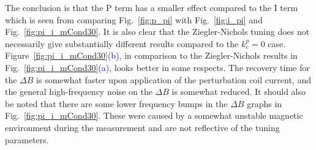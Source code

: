 
The conclusion is that the P term has a smaller effect compared to the
I term which is seen from comparing Fig.~\ref{fig:p_pi} with
Fig.~\ref{fig:i_pi} and Fig.~\ref{fig:pi_i_mCond30}. It is also clear that the Ziegler-Nichols tuning does not necessarily give substantially different results compared to the $k_c^p=0$ case. Figure~\ref{fig:pi_i_mCond30}\textcolor{blue}{(b)}, in comparison to the Ziegler-Nichols results in Fig.~\ref{fig:pi_i_mCond30}\textcolor{blue}{(a)}, looks better in some respects. The recovery time for the $\Delta B$ is somewhat faster upon application of the perturbation coil current, and the general high-frequency noise on the $\Delta B$ is somewhat reduced. It should also be noted that there are some lower frequency bumps in the $\Delta B$ graphs in Fig.~\ref{fig:pi_i_mCond30}. These were caused by a somewhat unstable magnetic environment during the measurement and are not reflective of the tuning parameters.


